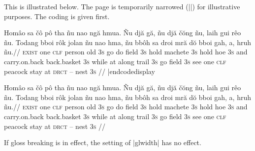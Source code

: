 This is illustrated below.  The page is temporarily narrowed
(|\hsize=2.5in|) for illustrative purposes.  The coding is given
first.


\codedisplay
\ex
\hsize=2.5in
\let\\=\textsc
\begingl[glhangindent=0pt,glbreaking=true]
\gla Hom\^{a}o sa \v{c}\^{o} p\^{o} tha  \~{n}u nao ng\u{a}
hmua. \~{N}u dj\u{a} g\u{a}, \~{n}u dj\u{a} \v{c}\u{o}ng \~{n}u,
laih gui r\^{e}o \~{n}u. Todang bboi r\^{o}k jolan \~{n}u nao
hma, \~{n}u bb\^{o}h sa droi mr\u{a} d\u{o} bboi gah, a, hruh
\~{n}u.//
\glb \\{exist} one \\{clf} person old \\{3s} go do field
\\{3s} hold machete \\{3s} hold hoe \\{3s} and carry.on.back
back.basket \\{3s} while at along trail \\{3s} go field \\{3s}
see one \\{clf} peacock stay at \\{drct} -- nest \\{3s}
//
\endgl
\xe
|endcodedisplay

\ex
\hsize=2.5in
\let\\=\textsc
\begingl[glhangstyle=none]
\gla Hom\^{a}o sa \v{c}\^{o} p\^{o} tha  \~{n}u nao ng\u{a}
hmua. \~{N}u dj\u{a} g\u{a}, \~{n}u dj\u{a} \v{c}\u{o}ng \~{n}u,
laih gui r\^{e}o \~{n}u. Todang bboi r\^{o}k jolan \~{n}u nao
hma, \~{n}u bb\^{o}h sa droi mr\u{a} d\u{o} bboi gah, a, hruh
\~{n}u.//
\glb \\{exist} one \\{clf} person old \\{3s} go do field
\\{3s} hold machete \\{3s} hold hoe \\{3s} and carry.on.back
back.basket \\{3s} while at along trail \\{3s} go field \\{3s}
see one \\{clf} peacock stay at \\{drct} -- nest \\{3s}
//
\endgl
\xe


If gloss breaking is in effect, the setting of |glwidth| has no
effect.



